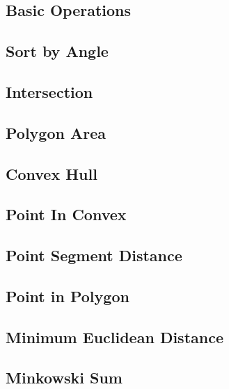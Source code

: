 \documentclass[a4paper,10pt,twocolumn,oneside,x11names]{article}
\begin{document}
\subsection{Basic Operations}


\subsection{Sort by Angle}


\subsection{Intersection}


\subsection{Polygon Area}


\subsection{Convex Hull}


\subsection{Point In Convex}


\subsection{Point Segment Distance}


\subsection{Point in Polygon}


\subsection{Minimum Euclidean Distance}


\subsection{Minkowski Sum}

\end{document}
